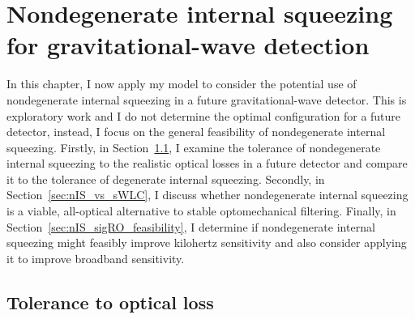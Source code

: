 \chapter{Nondegenerate internal squeezing for gravitational-wave detection}
\label{chp:science_case}


In this chapter, I now apply my model to consider the potential use of nondegenerate internal squeezing in a future gravitational-wave detector. This is exploratory work and I do not determine the optimal configuration for a future detector, instead, I focus on the general feasibility of nondegenerate internal squeezing. %
Firstly, in Section~\ref{sec:nIS_tolerance_to_losses}, I examine the tolerance of nondegenerate internal squeezing to the realistic optical losses in a future detector and compare it to the tolerance of degenerate internal squeezing. Secondly, in Section~\ref{sec:nIS_vs_sWLC}, I discuss whether nondegenerate internal squeezing is a viable, all-optical alternative to stable optomechanical filtering. Finally, in Section~\ref{sec:nIS_sigRO_feasibility}, I determine if nondegenerate internal squeezing might feasibly improve kilohertz sensitivity and also consider applying it to improve broadband sensitivity. %

\section{Tolerance to optical loss}
\label{sec:nIS_tolerance_to_losses}

